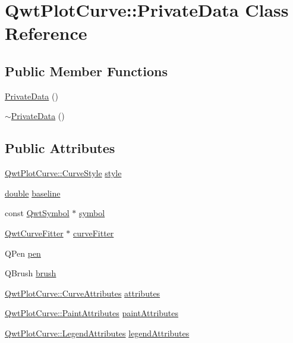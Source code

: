 \hypertarget{class_qwt_plot_curve_1_1_private_data}{\section{Qwt\-Plot\-Curve\-:\-:Private\-Data Class Reference}
\label{class_qwt_plot_curve_1_1_private_data}
}
\subsection*{Public Member Functions}
\begin{DoxyCompactItemize}
\item 
\hyperlink{class_qwt_plot_curve_1_1_private_data_a892ae8e66ee7c00a088be68d4784bd04}{Private\-Data} ()
\item 
\hyperlink{class_qwt_plot_curve_1_1_private_data_a9e80ce581f2bc1fd2680ba780fad547f}{$\sim$\-Private\-Data} ()
\end{DoxyCompactItemize}
\subsection*{Public Attributes}
\begin{DoxyCompactItemize}
\item 
\hyperlink{class_qwt_plot_curve_a15998aa80a11ba6ba80eebabaf773f70}{Qwt\-Plot\-Curve\-::\-Curve\-Style} \hyperlink{class_qwt_plot_curve_1_1_private_data_a1df7767ced8269a581bb2923d084ace9}{style}
\item 
\hyperlink{_super_l_u_support_8h_a8956b2b9f49bf918deed98379d159ca7}{double} \hyperlink{class_qwt_plot_curve_1_1_private_data_a9af3eeea01bcb3704f83664cc35b4133}{baseline}
\item 
const \hyperlink{class_qwt_symbol}{Qwt\-Symbol} $\ast$ \hyperlink{class_qwt_plot_curve_1_1_private_data_a5f0ec10ec239b40261c10ad6159688c3}{symbol}
\item 
\hyperlink{class_qwt_curve_fitter}{Qwt\-Curve\-Fitter} $\ast$ \hyperlink{class_qwt_plot_curve_1_1_private_data_af159f65bd5e80e4683960cc2e770dc68}{curve\-Fitter}
\item 
Q\-Pen \hyperlink{class_qwt_plot_curve_1_1_private_data_a01efdb4d5626885be4dce38a18f52c66}{pen}
\item 
Q\-Brush \hyperlink{class_qwt_plot_curve_1_1_private_data_aa38b83df97e5b5e3cfe9df50a3aeb809}{brush}
\item 
\hyperlink{class_qwt_plot_curve_a43f465d035a5125d582768944287c70c}{Qwt\-Plot\-Curve\-::\-Curve\-Attributes} \hyperlink{class_qwt_plot_curve_1_1_private_data_afb3b0b97979b35d6b42ce24de7b5bf43}{attributes}
\item 
\hyperlink{class_qwt_plot_curve_a39ba40485087294c775a367d859b6237}{Qwt\-Plot\-Curve\-::\-Paint\-Attributes} \hyperlink{class_qwt_plot_curve_1_1_private_data_a07ff7c0da3fb7b49d0745e1b57e92f2d}{paint\-Attributes}
\item 
\hyperlink{class_qwt_plot_curve_aa9b27e27ddc27466eed70485e690daa6}{Qwt\-Plot\-Curve\-::\-Legend\-Attributes} \hyperlink{class_qwt_plot_curve_1_1_private_data_acfc0224fcffc62660df356d4025c82ee}{legend\-Attributes}
\end{DoxyCompactItemize}


